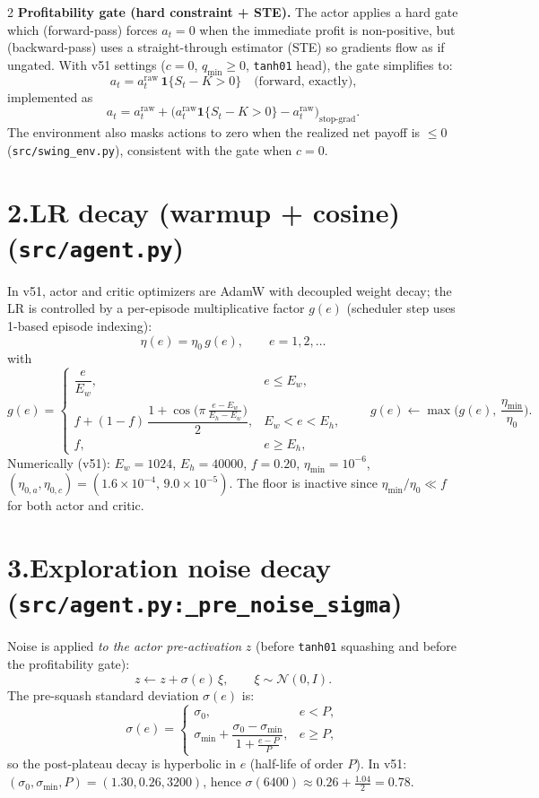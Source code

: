 \documentclass[10pt]{article}
\newcommand{\code}[1]{\texttt{#1}}
\newcommand{\1}{\mathbf{1}}
\begin{document}
\begin{multicols}{2}
\textbf{Profitability gate (hard constraint + STE).} The actor applies a hard gate which (forward-pass) forces $a_t=0$ when the immediate profit is non-positive, but (backward-pass) uses a straight-through estimator (STE) so gradients flow as if ungated. With v51 settings ($c{=}0$, $q_{\min}\ge 0$, \texttt{tanh01} head), the gate simplifies to:
\[
a_t = a^{\text{raw}}_t\,\1\{S_t-K>0\}
\quad\text{(forward, exactly),}
\]
implemented as
\[
a_t = a^{\text{raw}}_t + \big(a^{\text{raw}}_t\1\{S_t-K>0\}-a^{\text{raw}}_t\big)_{\text{stop-grad}}.
\]
The environment also masks actions to zero when the realized net payoff is $\le 0$ (\code{src/swing\_env.py}), consistent with the gate when $c{=}0$.

\section*{2.\;LR decay (warmup + cosine) (\code{src/agent.py})}
In v51, actor and critic optimizers are AdamW with decoupled weight decay; the LR is controlled by a per-episode multiplicative factor $g(e)$ (scheduler step uses 1-based episode indexing):
\[
\eta(e)=\eta_0\,g(e),\qquad e=1,2,\dots
\]
with
\[
g(e)=
\begin{cases}
\dfrac{e}{E_w}, & e\le E_w,\\[0.6em]
f+(1-f)\,\dfrac{1+\cos\!\big(\pi\,\frac{e-E_w}{E_h-E_w}\big)}{2}, & E_w< e < E_h,\\[0.6em]
f, & e\ge E_h,
\end{cases}
\qquad
g(e)\leftarrow \max\!\Big(g(e),\,\dfrac{\eta_{\min}}{\eta_0}\Big).
\]
Numerically (v51): $E_w{=}1024$, $E_h{=}40000$, $f{=}0.20$, $\eta_{\min}{=}10^{-6}$, $(\eta_{0,a},\eta_{0,c})=(1.6{\times}10^{-4},\,9.0{\times}10^{-5})$. The floor is inactive since $\eta_{\min}/\eta_0 \ll f$ for both actor and critic.

\section*{3.\;Exploration noise decay (\code{src/agent.py:\_pre\_noise\_sigma})}
Noise is applied \emph{to the actor pre-activation} $z$ (before \texttt{tanh01} squashing and before the profitability gate):
\[
z \leftarrow z + \sigma(e)\,\xi,\qquad \xi\sim\mathcal{N}(0,I).
\]
The pre-squash standard deviation $\sigma(e)$ is:
\[
\sigma(e)=
\begin{cases}
\sigma_0, & e < P,\\[0.4em]
\sigma_{\min} + \dfrac{\sigma_0-\sigma_{\min}}{1 + \frac{e-P}{P}}, & e\ge P,
\end{cases}
\]
so the post-plateau decay is hyperbolic in $e$ (half-life of order $P$). In v51: $(\sigma_0,\sigma_{\min},P)=(1.30,0.26,3200)$, hence $\sigma(6400)\approx 0.26+\frac{1.04}{2}=0.78$.


\end{multicols}
\end{document}
